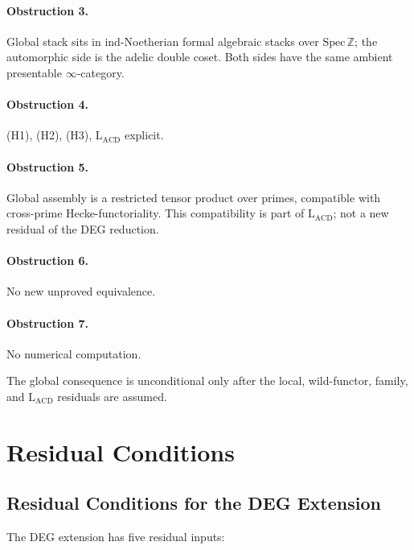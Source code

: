 \paragraph{Obstruction 3.} Global stack sits in ind-Noetherian formal
algebraic stacks over \(\mathrm{Spec}\,\mathbb{Z}\); the automorphic
side is the adelic double coset. Both sides have the same ambient
presentable \(\infty\)-category.

\paragraph{Obstruction 4.} (H1), (H2), (H3), \(\mathrm{L}_{\mathrm{ACD}}\)
explicit.

\paragraph{Obstruction 5.} Global assembly is a restricted tensor product
over primes, compatible with cross-prime Hecke-functoriality. This
compatibility is part of \(\mathrm{L}_{\mathrm{ACD}}\); not a new
residual of the DEG reduction.

\paragraph{Obstruction 6.} No new unproved equivalence.

\paragraph{Obstruction 7.} No numerical computation.

The global consequence is unconditional only after the local,
wild-functor, family, and \(\mathrm{L}_{\mathrm{ACD}}\) residuals are
assumed.

\section{Residual Conditions}
\label{v4-arith:deg-f1a:residuals}

\subsection{Residual Conditions for the DEG Extension}

The DEG extension has five residual inputs:

